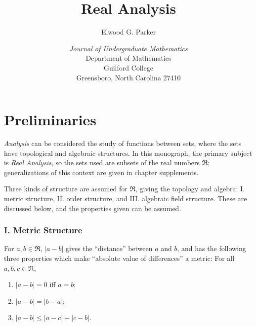 \documentclass{article}
\let\titlepageAuthor\author
\renewcommand{\author}[1]{\newcommand{\headerAuthor}{#1}\titlepageAuthor{#1}}
\let\titlepageTitle\title
\renewcommand{\title}[1]{\newcommand{\headerTitle}{#1}\titlepageTitle{#1}}
\begin{document}
\title{Real Analysis}
\author{Elwood G. Parker}
\date{\vspace{3cm}
\emph{Journal of Undergraduate Mathematics}
  \\ Department of Mathematics
  \\ Guilford College
  \\ Greensboro, North Carolina 27410 
  }
\maketitle
\thispagestyle{empty}



\newpage

\setcounter{tocdepth}{3} 
\tableofcontents
\thispagestyle{empty}


\newpage

\section{Preliminaries}


\emph{Analysis} can be considered the study of functions between sets, where the sets have topological and algebraic structures. In this monograph, the primary subject is \emph{Real Analysis}, so the sets used are subsets of the real numbers $\Re$; generalizations of this context are given in chapter supplements.

Three kinds of structure are assumed for $\Re$, giving the topology and algebra: I. metric structure, II. order structure, and III. algebraic field structure. These are discussed below, and the properties given can be assumed.


\subsubsection*{I. Metric Structure}

For $a,b \in \Re$, $|a-b|$ gives the ``distance'' between $a$ and $b$, and has the following three properties which make ``absolute value of differences'' a metric: For all $a,b,c \in \Re$,
\begin{enumerate}[\hspace{1cm}(1)]
  \item $|a-b| = 0$ iff $a = b$; 
  \item $|a-b| = |b-a|$;
  \item $|a-b| \leq |a-c| + |c-b|$.
\end{enumerate}
\end{document}
